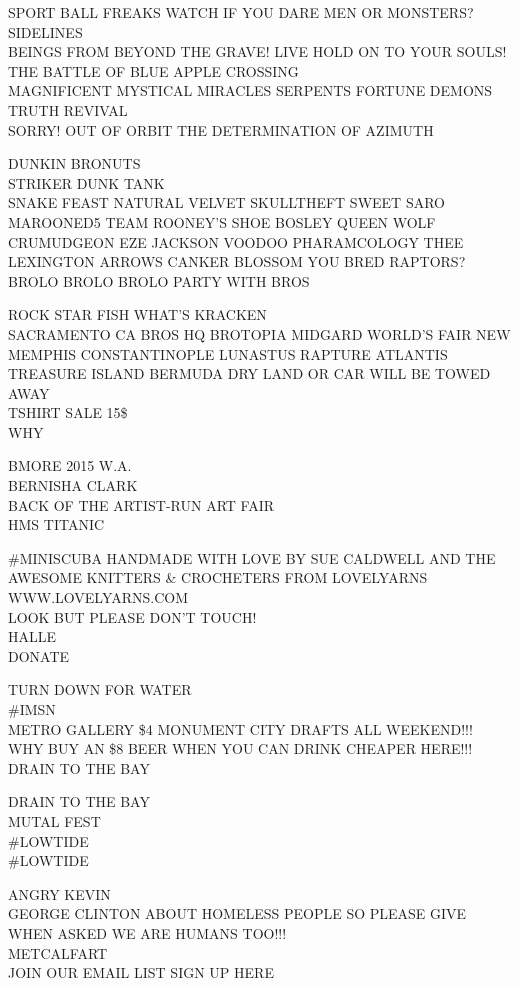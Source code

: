 \documentclass[10pt,letterpaper]{article}
\begin{document}
SPORT BALL FREAKS WATCH IF YOU DARE MEN OR MONSTERS?  SIDELINES\\
BEINGS FROM BEYOND THE GRAVE!   LIVE HOLD ON TO YOUR SOULS!  THE BATTLE OF BLUE APPLE CROSSING\\
MAGNIFICENT MYSTICAL MIRACLES SERPENTS FORTUNE DEMONS TRUTH REVIVAL\\
SORRY!  OUT OF ORBIT THE DETERMINATION OF AZIMUTH

DUNKIN BRONUTS\\
STRIKER DUNK TANK\\
SNAKE FEAST NATURAL VELVET SKULLTHEFT SWEET SARO MAROONED5 TEAM ROONEY'S SHOE BOSLEY QUEEN WOLF CRUMUDGEON EZE JACKSON VOODOO PHARAMCOLOGY THEE LEXINGTON ARROWS CANKER BLOSSOM YOU BRED RAPTORS?\\
BROLO BROLO BROLO PARTY WITH BROS

ROCK STAR FISH WHAT'S KRACKEN\\
SACRAMENTO CA BROS HQ BROTOPIA MIDGARD WORLD'S FAIR NEW MEMPHIS CONSTANTINOPLE LUNASTUS RAPTURE ATLANTIS TREASURE ISLAND BERMUDA DRY LAND OR CAR WILL BE TOWED AWAY\\
TSHIRT SALE 15\$\\
WHY

BMORE 2015 W.A.\\
BERNISHA CLARK\\
BACK OF THE ARTIST{-}RUN ART FAIR\\
HMS TITANIC

\#MINISCUBA HANDMADE WITH LOVE BY SUE CALDWELL AND THE AWESOME KNITTERS \& CROCHETERS FROM LOVELYARNS WWW.LOVELYARNS.COM\\
LOOK BUT PLEASE DON'T TOUCH!\\
HALLE\\
DONATE

TURN DOWN FOR WATER\\
\#IMSN\\
METRO GALLERY \$4 MONUMENT CITY DRAFTS ALL WEEKEND!!!  WHY BUY AN \$8 BEER WHEN YOU CAN DRINK CHEAPER HERE!!!\\
DRAIN TO THE BAY

DRAIN TO THE BAY\\
MUTAL FEST\\
\#LOWTIDE\\
\#LOWTIDE

ANGRY KEVIN\\
GEORGE CLINTON ABOUT HOMELESS PEOPLE SO PLEASE GIVE WHEN ASKED WE ARE HUMANS TOO!!!\\
METCALFART\\
JOIN OUR EMAIL LIST SIGN UP HERE
\end{document}
